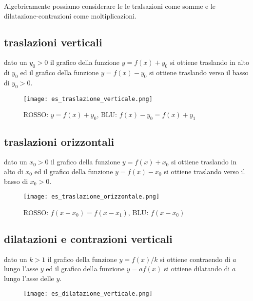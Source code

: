 \documentclass[../main.tex, class=article, 12pt]{subfiles}
\begin{document}
Algebricamente possiamo considerare le le tralsazioni come somme e 
le dilatazione-contrazioni come moltiplicazioni. 


\subsection{traslazioni verticali}\label{sec:traslazioni_verticali}
dato un $ y_0 > 0 $ il grafico della funzione $ y =f(x) + y_0 $ si ottiene traslando
in alto di $ y_0 $ ed il grafico della funzione $ y = f(x) - y_0 $ si ottiene traslando
verso il basso di $ y_0 > 0 $.
\begin{figure}[H]
  	\texttt{[image: es\_traslazione\_verticale.png]}
  	\caption{ROSSO: $ y = f(x) + y_0 $, BLU: $ f(x)-y_0 = f(x)+y_1 $}
        \label{fig:es_traslazione_verticale.png}
\end{figure}



\subsection{traslazioni orizzontali}\label{sec:traslazioni_orizzontali}
dato un $ x_0 > 0 $ il grafico della funzione $ y =f(x) + x_0 $ si ottiene traslando
in alto di $ x_0 $ ed il grafico della funzione $ y = f(x) - x_0 $ si ottiene traslando
verso il basso di $ x_0 > 0 $.
\begin{figure}[H]
  	\texttt{[image: es\_traslazione\_orizzontale.png]}
        \caption{ROSSO: $f(x+x_0) = f(x- x_1) $, BLU: $f(x-x_0)$} 
        \label{fig:es_traslazione_orizzontale.png}
\end{figure}



\subsection{dilatazioni e contrazioni verticali}\label{sec:dilatazioni_e_contrazioni_verticali}
dato un $ k > 1 $ il grafico della funzione $ y = f(x)/k$ si ottiene contraendo di $ a $ lungo 
l'asse $ y $ ed il grafico della funzione $ y = af(x)$ si ottiene dilatando di $ a $
lungo l'asse delle $ y $.


\begin{figure}[H]
  	\texttt{[image: es\_dilatazione\_verticale.png]}
  	\caption{}
        \label{fig:es_dilatazione_verticale.png}
\end{figure}
\end{document}
